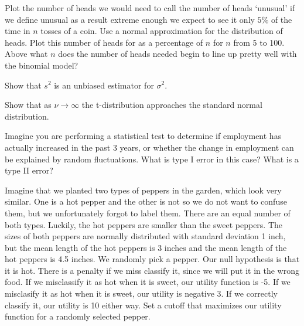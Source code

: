 \begin{exe} Plot the number of heads we would need to call the number of heads `unusual' if we define unusual as a result extreme enough we expect to see it only $5\%$ of the time in $n$ tosses of a coin. Use a normal approximation for the distribution of heads.  Plot this number of heads for as a percentage of $n$ for $n$ from 5 to 100.  Above what $n$ does the number of heads needed begin to line up pretty well with the binomial model? \end{exe}



\begin{exe} Show that $s^2$ is an unbiased estimator for $\sigma^2$. \end{exe}



\begin{exe} Show that as $\nu \to \infty$ the t-distribution approaches the standard normal distribution. \end{exe}



\begin{exe} Imagine you are performing a statistical test to determine if employment has actually increased in the past 3 years, or whether the change in employment can be explained by random fluctuations.  What is type I error in this case? What is a type II error? \end{exe}



\begin{exe} Imagine that we planted two types of peppers in the garden, which look very similar.  One is a hot pepper and the other is not so we do not want to confuse them, but we unfortunately forgot to label them.  There are an equal number of both types.  Luckily, the hot peppers are smaller than the sweet peppers.  The sizes of both peppers are normally distributed with standard deviation 1 inch, but the mean length of the hot peppers is 3 inches and the mean length of the hot peppers is 4.5 inches.  We randomly pick a pepper. Our null hypothesis is that it is hot.  There  is a penalty if we miss classify it, since we will put it in the wrong food.  If we misclassify it as hot when it is sweet, our utility function is -5.  If we misclasify it as hot when it is sweet, our utility is negative 3.  If we correctly classify it, our utility is 10 either way.  Set a cutoff that maximizes our utility function for a randomly selected pepper. \end{exe}



